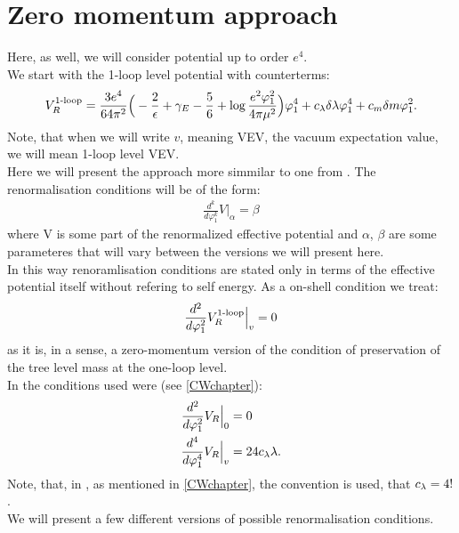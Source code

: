 \chapter{Zero momentum approach}

Here, as well, we will consider potential up to order $e^4$. \\

We start with the 1-loop level potential with counterterms:
\begin{align}
V_R^{\textrm{1-loop}} = \frac{3e^4}{64\pi^2}\Big(-\frac{2}{\epsilon}+\gamma_E-\frac{5}{6}+
\log{\frac{e^2\varphi_1^2}{4\pi\mu^2}}\Big)\varphi_1^4 + c_\lambda\delta\lambda\varphi_1^4+c_m\delta m\varphi_1^2.
\end{align} 
Note, that when we will write $v$, meaning VEV, the vacuum expectation value, we will mean 
1-loop level VEV. \\

Here we will present the approach more simmilar to one from \cite{Coleman1973}. 
The renormalisation conditions will be of the form:
\begin{align}
\frac{d^k}{d\varphi_1^k}V\Big|_{\alpha} = \beta
\end{align}
where V is some part of the renormalized effective potential and $\alpha$, $\beta$ are some 
parameteres that will vary between the versions we will present here. \\

In this way renoramlisation conditions are stated only in terms of the effective potential itself 
without refering to self energy. As a on-shell condition we treat:
\begin{align}
{\frac{d^{2}}{d \varphi_1^{2}}V_R^{\textrm{1-loop}}}\Big|_v = 0
\end{align}
as it is, in a sense, a zero-momentum version of the condition of preservation of the tree 
level mass at the one-loop level. \\

In \cite{Coleman1973} the conditions used were (see \ref{CWchapter}):
\begin{align}
{\frac{d^{2}}{d \varphi_1^{2}}V_R\Big|_{0}} &= 0 \\
{\frac{d^{4}}{d \varphi_1^{4}}V_R\Big|_{v}} &= 24c_\lambda\lambda.
\end{align}
Note, that, in \citeColWein, as mentioned in \ref{CWchapter}, the convention is used, that 
$c_\lambda = 4!$. \\

We will present a few different versions of possible renormalisation conditions.
